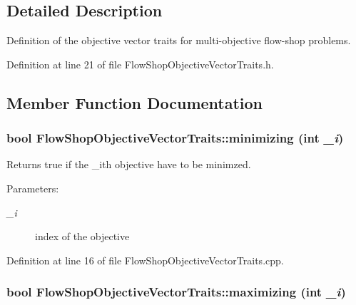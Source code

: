 \subsection{Detailed Description}
Definition of the objective vector traits for multi-objective flow-shop problems. 



Definition at line 21 of file Flow\-Shop\-Objective\-Vector\-Traits.h.

\subsection{Member Function Documentation}
\subsubsection{\setlength{\rightskip}{0pt plus 5cm}bool Flow\-Shop\-Objective\-Vector\-Traits::minimizing (int {\em \_\-i})\hspace{0.3cm}{\tt  [static]}}\label{classFlowShopObjectiveVectorTraits_e1a0f5be1782b9f9ce08128a404a1fa8}


Returns true if the \_\-ith objective have to be minimzed. 

\begin{Desc}
\item[Parameters:]
\begin{description}
\item[{\em \_\-i}]index of the objective \end{description}
\end{Desc}


Definition at line 16 of file Flow\-Shop\-Objective\-Vector\-Traits.cpp.
\subsubsection{\setlength{\rightskip}{0pt plus 5cm}bool Flow\-Shop\-Objective\-Vector\-Traits::maximizing (int {\em \_\-i})\hspace{0.3cm}{\tt  [static]}}\label{classFlowShopObjectiveVectorTraits_229fbb4cc19d289637891c1b49f3eaba}


